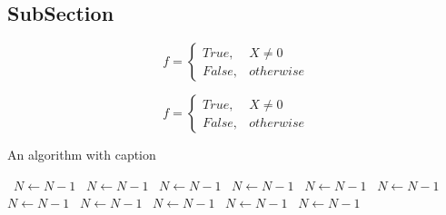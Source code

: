 \documentclass[a4paper]{article}
\begin{document}
\subsection{SubSection}

\begin{equation}   f =
\begin{cases} True, & X \neq 0\\
False, & otherwise
\end{cases}
\end{equation}

\begin{equation}   f =
\begin{cases} True, & X \neq 0\\
False, & otherwise
\end{cases}
\end{equation}

\begin{algorithm}
\caption{An algorithm with caption}
\begin{algorithmic}
\    \State $N \gets N - 1$
\    \State $N \gets N - 1$
\    \State $N \gets N - 1$
\    \State $N \gets N - 1$
\    \State $N \gets N - 1$
\    \State $N \gets N - 1$
\    \State $N \gets N - 1$
\    \State $N \gets N - 1$
\    \State $N \gets N - 1$
\    \State $N \gets N - 1$
\    \State $N \gets N - 1$
\EndWhile
\end{algorithmic}
\end{algorithm}
\end{document}
